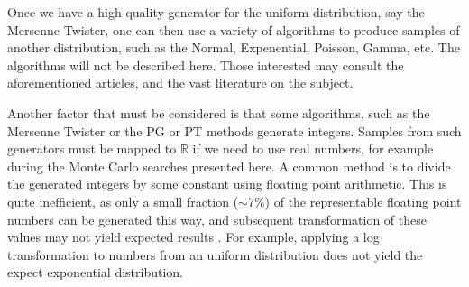 Once we have a high quality generator for the uniform distribution, say 
the Mersenne Twister, one can then use a variety of algorithms to produce 
samples of another distribution, such as the Normal, Expenential, Poisson, Gamma, \citep{Ahrens1993} etc. The algorithms 
will not be described here. Those interested may consult the 
aforementioned articles, and the vast literature on the subject.

Another factor that must be considered is that some algorithms, such as 
the Mersenne Twister or the PG or PT methods \citep{Ahrens1993} generate 
integers. Samples from such generators must be mapped to $\mathbb{R}$ if 
we need to use real numbers, for example during the Monte Carlo searches 
presented here. A common method is to divide the generated integers by 
some constant using floating point arithmetic. This is quite inefficient, 
as only a small fraction ($\sim 7\%$) of the representable floating point 
numbers can be generated this way, and subsequent transformation of these 
values may not yield expected results \citep{Downey2007}. For example, 
applying a log transformation to numbers from an uniform distribution does 
not yield the expect exponential distribution.
